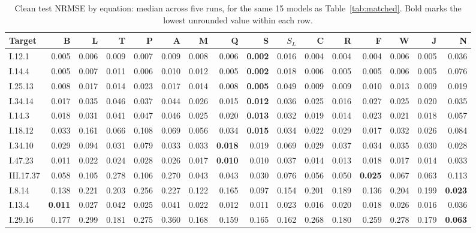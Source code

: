 \begin{table}[!htbp]\centering\scriptsize\setlength{\tabcolsep}{2pt}
\caption{Clean test NRMSE by equation: median across five runs, for the same 15 models as Table~\ref{tab:matched}. Bold marks the lowest unrounded value within each row.}\label{tab:per_equation}
\begin{tabular}{lrrrrrrrrrrrrrrr}
\toprule Target & B & L & T & P & A & M & Q & S & $S_L$ & C & R & F & W & J & N \\ \midrule
I.12.1 & 0.005 & 0.006 & 0.009 & 0.007 & 0.009 & 0.008 & 0.006 & \textbf{0.002} & 0.016 & 0.004 & 0.004 & 0.004 & 0.006 & 0.005 & 0.036 \\
I.14.4 & 0.005 & 0.007 & 0.011 & 0.006 & 0.010 & 0.012 & 0.005 & \textbf{0.002} & 0.018 & 0.006 & 0.005 & 0.005 & 0.006 & 0.005 & 0.076 \\
I.25.13 & 0.008 & 0.017 & 0.014 & 0.023 & 0.017 & 0.014 & 0.008 & \textbf{0.005} & 0.049 & 0.009 & 0.009 & 0.010 & 0.013 & 0.009 & 0.019 \\
I.34.14 & 0.017 & 0.035 & 0.046 & 0.037 & 0.044 & 0.026 & 0.015 & \textbf{0.012} & 0.036 & 0.025 & 0.016 & 0.027 & 0.025 & 0.020 & 0.035 \\
I.14.3 & 0.018 & 0.031 & 0.041 & 0.047 & 0.046 & 0.025 & 0.020 & \textbf{0.013} & 0.032 & 0.019 & 0.014 & 0.023 & 0.021 & 0.018 & 0.057 \\
I.18.12 & 0.033 & 0.161 & 0.066 & 0.108 & 0.069 & 0.056 & 0.034 & \textbf{0.015} & 0.034 & 0.022 & 0.029 & 0.017 & 0.032 & 0.026 & 0.084 \\
I.34.10 & 0.029 & 0.094 & 0.031 & 0.079 & 0.033 & 0.033 & \textbf{0.018} & 0.019 & 0.069 & 0.029 & 0.037 & 0.034 & 0.035 & 0.030 & 0.028 \\
I.47.23 & 0.011 & 0.022 & 0.024 & 0.028 & 0.026 & 0.017 & \textbf{0.010} & 0.010 & 0.037 & 0.014 & 0.013 & 0.018 & 0.017 & 0.014 & 0.033 \\
III.17.37 & 0.058 & 0.105 & 0.278 & 0.106 & 0.270 & 0.043 & 0.043 & 0.030 & 0.076 & 0.056 & 0.050 & \textbf{0.025} & 0.067 & 0.063 & 0.113 \\
I.8.14 & 0.138 & 0.221 & 0.203 & 0.256 & 0.227 & 0.122 & 0.165 & 0.097 & 0.154 & 0.201 & 0.189 & 0.136 & 0.204 & 0.199 & \textbf{0.023} \\
I.13.4 & \textbf{0.011} & 0.027 & 0.042 & 0.025 & 0.041 & 0.022 & 0.012 & 0.011 & 0.023 & 0.016 & 0.020 & 0.018 & 0.026 & 0.016 & 0.036 \\
I.29.16 & 0.177 & 0.299 & 0.181 & 0.275 & 0.360 & 0.168 & 0.159 & 0.165 & 0.162 & 0.268 & 0.180 & 0.259 & 0.278 & 0.179 & \textbf{0.063} \\

\end{tabular}
\end{table}
